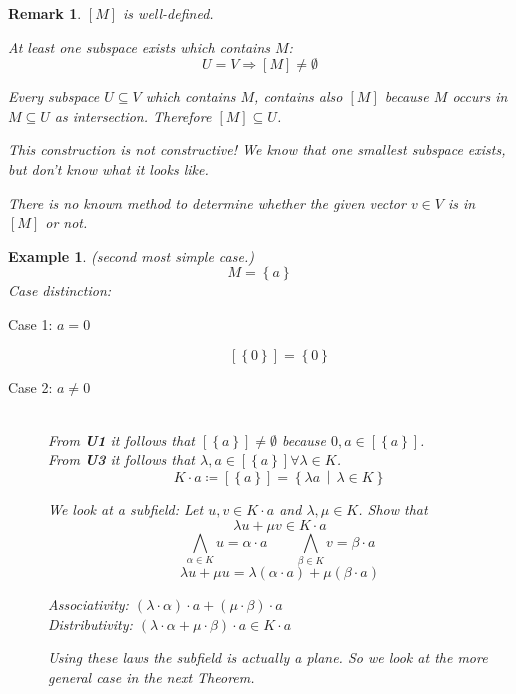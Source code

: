 \documentclass[a4paper,landscape,twocolumn]{article}
\newcommand\set[1]{\left\{#1\right\}}
\newcommand\setdef[2]{\left\{#1\,\middle|\,#2\right\}}
\newtheorem{ex}{Example}
\newtheorem{rem}{Remark}
\begin{document}
\begin{rem}
  $[M]$ is well-defined.

  At least one subspace exists which contains $M$:
  \[ U = V \Rightarrow [M] \neq \emptyset \]

  Every subspace $U \subseteq V$ which contains $M$,
  contains also $[M]$ because $M$ occurs in $M \subseteq U$ as intersection.
  Therefore $[M] \subseteq U$.

  This construction is not constructive!
  We know that one smallest subspace exists, but don't know what it looks like.

  There is no known method to determine whether the given vector $v \in V$ is in
  $[M]$ or not.
\end{rem}

\begin{ex}
  (second most simple case.)
  \[ M = \set{a} \]
  Case distinction:
  \begin{description}
    \item[Case 1: $a = 0$]
      \[ \left[\set{0}\right] = \set{0} \]
    \item[Case 2: $a \neq 0$] \hfill{} \\
      From \textbf{U1} it follows that $\left[\set{a}\right] \neq \emptyset$ because $0,a \in \left[\set{a}\right]$. \\
      From \textbf{U3} it follows that $\lambda,a \in \left[\set{a}\right] \forall \lambda \in K$.
      \[ K\cdot a \coloneqq \left[\set{a}\right] = \setdef{\lambda a}{\lambda \in K} \]

      We look at a subfield:
      Let $u, v \in K \cdot a$ and $\lambda, \mu \in K$. Show that
      \[ \lambda u + \mu v \in K \cdot a \]
      \[
          \bigwedge_{\alpha \in K} u = \alpha \cdot a \qquad
          \bigwedge_{\beta \in K} v = \beta \cdot a
      \]  \[
        \lambda u + \mu u = \lambda (\alpha \cdot a) + \mu (\beta \cdot a)
      \]

      Associativity: $(\lambda \cdot \alpha) \cdot a + (\mu \cdot \beta) \cdot a$ \\
      Distributivity: $(\lambda \cdot \alpha + \mu \cdot \beta) \cdot a \in K \cdot a$

      Using these laws the subfield is actually a plane.
      So we look at the more general case in the next Theorem.
  \end{description}
\end{ex}
\end{document}
